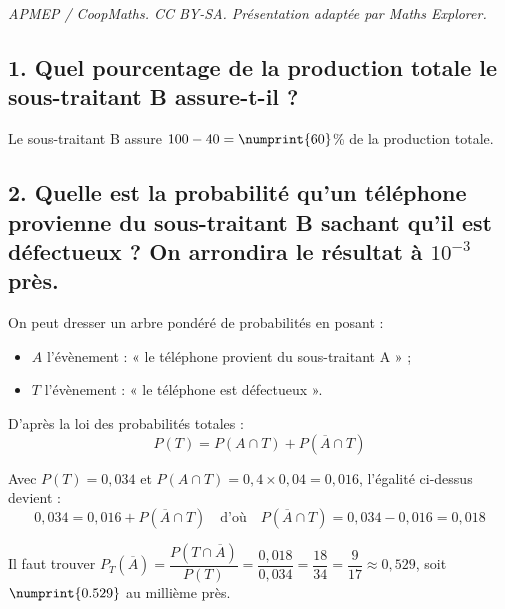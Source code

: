 \documentclass[10pt]{article}
\begin{document}
\noindent\textit{APMEP / CoopMaths. CC BY-SA. Présentation adaptée par Maths Explorer.}\par\medskip
\subsection*{1. Quel pourcentage de la production totale le sous-traitant B assure-t-il ?}
	
	Le sous-traitant B assure $100 - 40 = \numprint{60}$\% de la production totale.
	
	\subsection*{2. Quelle est la probabilité qu'un téléphone provienne du sous-traitant B sachant qu'il est défectueux ? On arrondira le résultat à $10^{-3}$ près.}
	
	On peut dresser un arbre pondéré de probabilités en posant :
	\begin{itemize}
		\item $A$ l'évènement : « le téléphone provient du sous-traitant A » ;
		\item $T$ l'évènement : « le téléphone est défectueux ».
	\end{itemize}
	
	
	D'après la loi des probabilités totales :
	\[
	P(T) = P(A \cap T) + P(\overline{A} \cap T)
	\]
	
	Avec $P(T) = 0,034$ et $P(A \cap T) = 0,4 \times 0,04 = 0,016$, l'égalité ci-dessus devient :
	\[
	0,034 = 0,016 + P(\overline{A} \cap T) \quad \text{d'où} \quad P(\overline{A} \cap T) = 0,034 - 0,016 = 0,018
	\]
	
	Il faut trouver $P_T(\overline{A}) = \dfrac{P(T \cap \overline{A})}{P(T)} = \dfrac{0,018}{0,034} = \dfrac{18}{34} = \dfrac{9}{17} \approx 0,529$, soit $\numprint{0.529}$ au millième près.
\end{document}

